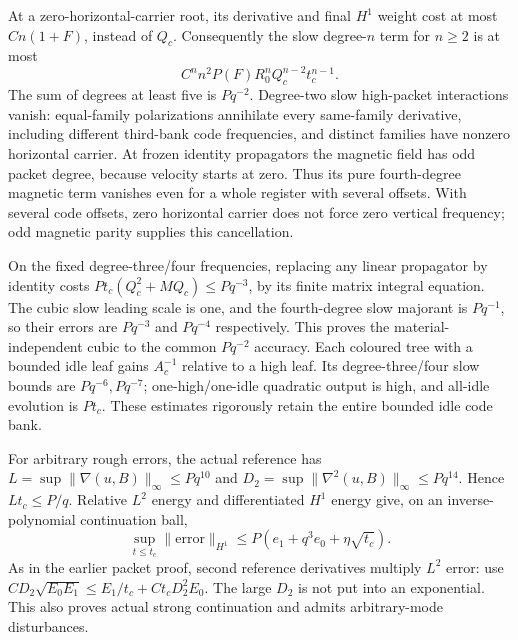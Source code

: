 \documentclass[11pt,a4paper]{amsart}
\theoremstyle{definition}
\theoremstyle{remark}
\numberwithin{equation}{section}
\newcommand{\norm}[1]{\lVert #1\rVert}
\begin{document}
At a zero-horizontal-carrier root, its derivative and final $H^1$ weight
cost at most $Cn(1+F)$, instead of $Q_c$.  Consequently the slow
degree-$n$ term for $n\ge2$ is at most
\begin{equation}\label{eq:register-triad-slow-majorant}
 C^nn^2P(F)R_0^nQ_c^{n-2}t_c^{n-1}.
\end{equation}
The sum of degrees at least five is $Pq^{-2}$.
Degree-two slow high-packet interactions vanish: equal-family
polarizations annihilate every same-family derivative, including different
third-bank code frequencies, and distinct families have nonzero horizontal
carrier.  At frozen identity propagators the magnetic field has odd packet
degree, because velocity starts at zero.  Thus its pure fourth-degree
magnetic term vanishes even for a whole register with several offsets.
With several code offsets, zero horizontal carrier does not force zero
vertical frequency; odd magnetic parity supplies this cancellation.

On the fixed degree-three/four frequencies, replacing any linear
propagator by identity costs
$Pt_c(Q_c^2+MQ_c)\le Pq^{-3}$, by its finite matrix integral equation.
The cubic slow leading scale is one, and the fourth-degree slow majorant
is $Pq^{-1}$, so their errors are $Pq^{-3}$ and $Pq^{-4}$ respectively.
This proves the material-independent cubic to the common $Pq^{-2}$
accuracy.  Each coloured tree with a bounded idle leaf gains $A_c^{-1}$
relative to a high leaf.  Its degree-three/four slow bounds are
$Pq^{-6},Pq^{-7}$; one-high/one-idle quadratic output is high, and
all-idle evolution is $Pt_c$.  These estimates rigorously retain the
entire bounded idle code bank.

For arbitrary rough errors, the actual reference has
$L=\sup\norm{\nabla(u,B)}_\infty\le Pq^{10}$ and
$D_2=\sup\norm{\nabla^2(u,B)}_\infty\le Pq^{14}$.
Hence $Lt_c\le P/q$.  Relative $L^2$ energy and differentiated $H^1$
energy give, on an inverse-polynomial continuation ball,
\begin{equation}\label{eq:register-cubic-rough}
 \sup_{t\le t_c}\norm{\text{error}}_{H^1}
       \le P(e_1+q^3e_0+\eta\sqrt{t_c}).
\end{equation}
As in the earlier packet proof, second reference derivatives multiply
$L^2$ error: use
$CD_2\sqrt{E_0E_1}\le E_1/t_c+Ct_cD_2^2E_0$.
The large $D_2$ is not put into an exponential.  This also proves actual
strong continuation and admits arbitrary-mode disturbances.
\end{document}
